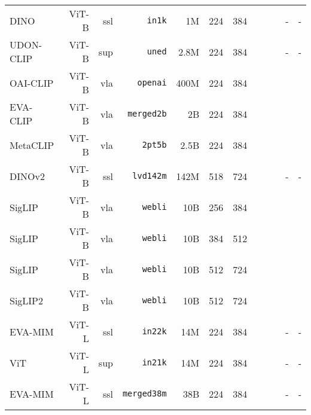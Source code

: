 \begin{tabular}{l@{\lsp}rrrrrr@{\lsp}CCCCC}
DINO~\cite{ctm+21}               & ViT-B & ssl & \texttt{in1k}      & 1M   & 224  & 384 &   &   &   & -           & -           \\
UDON-CLIP~\cite{yca+24}          & ViT-B & sup & \texttt{uned}      & 2.8M & 224  & 384 &   &   &   & -           & -           \\
OAI-CLIP~\cite{clip}             & ViT-B & vla & \texttt{openai}    & 400M & 224  & 384 &  &   &   &   &   \\
EVA-CLIP~\cite{evaclip}          & ViT-B & vla & \texttt{merged2b}  & 2B   & 224  & 384 &  &   &   &   &   \\
MetaCLIP~\cite{metaclip}         & ViT-B & vla & \texttt{2pt5b}     & 2.5B & 224  & 384 &  &   &   &   &   \\
DINOv2~\cite{odm+24}             & ViT-B & ssl & \texttt{lvd142m}   & 142M & 518  & 724 &  &  &  & -           & -           \\
SigLIP~\cite{siglip}             & ViT-B & vla & \texttt{webli}     & 10B  & 256  & 384 &  &  &  &   &  \\
SigLIP~\cite{siglip}             & ViT-B & vla & \texttt{webli}     & 10B  & 384  & 512 &  &  &  &  &  \\
SigLIP~\cite{siglip}             & ViT-B & vla & \texttt{webli}     & 10B  & 512  & 724 &  &  &  &  &  \\
SigLIP2~\cite{siglip2}           & ViT-B & vla & \texttt{webli}     & 10B  & 512  & 724 &  &  &  &  &  \\
\midrule
EVA-MIM~\cite{fwx+23}            & ViT-L & ssl & \texttt{in22k}     & 14M  & 224  & 384 &   &   &   & -           & -           \\
ViT~\cite{dbk+21,vit-augreg}     & ViT-L & sup & \texttt{in21k}     & 14M  & 224  & 384 &   &   &   & -           & -           \\
EVA-MIM~\cite{fwx+23}            & ViT-L & ssl & \texttt{merged38m} & 38B  & 224  & 384 &   &   &   & -           & -           \\

\end{tabular}
